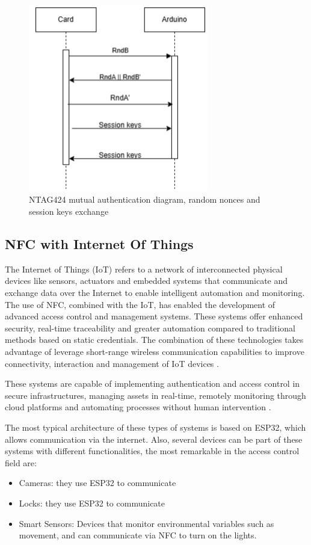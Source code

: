 \begin{figure}[h!]
	\centering
	\includegraphics[width=0.7\textwidth]{imaxes/MA_diagram.png} %
	\caption{NTAG424 mutual authentication diagram, random nonces and session keys exchange}
	\label{fig:ntag424_ev2}
\end{figure}

\subsection{NFC with Internet Of Things}

The Internet of Things (IoT) refers to a network of interconnected physical devices like sensors, actuators and embedded systems that communicate and exchange data over the Internet to enable intelligent automation and monitoring. The use of NFC, combined with the IoT, has enabled the development of advanced access control and management systems. These systems offer enhanced security, real-time traceability and greater automation compared to traditional methods based on static credentials. The combination of these technologies takes advantage of leverage short-range wireless communication capabilities to improve connectivity, interaction and management of IoT devices \cite{ref33}.

These systems are capable of implementing authentication and access control in secure infrastructures, managing assets in real-time, remotely monitoring through cloud platforms and automating processes without human intervention \cite{ref34}.

The most typical architecture of these types of systems is based on ESP32, which allows communication via the internet. Also, several devices can be part of these systems with different functionalities, the most remarkable in the access control field are:
\begin{itemize}
	\item Cameras: they use ESP32 to communicate
	\item Locks: they use ESP32 to communicate
	\item Smart Sensors: Devices that monitor environmental variables such as movement, and can communicate via NFC to turn on the lights.
\end{itemize}

